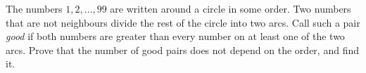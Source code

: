 The numbers $1,2,\dots,99$ are written around a circle in some order. Two numbers that are not neighbours divide the rest of the circle into two arcs. Call such a pair \emph{good} if both numbers are greater than every number on at least one of the two arcs. Prove that the number of good pairs does not depend on the order, and find it.
